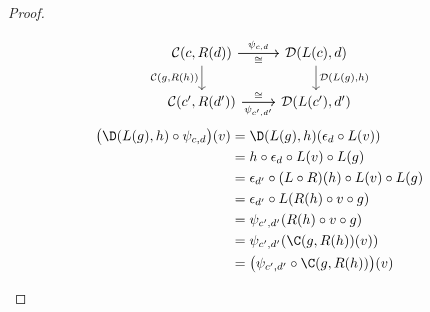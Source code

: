 \begin{theorem}
\begin{proof}
\begin{description}
        \[\begin{tikzcd}[ampersand replacement=\&]
          {\mathcal{C}(c, R(d))} \& {\mathcal{D}(L(c), d)} \\
          {\mathcal{C}(c', R(d'))} \& {\mathcal{D}(L(c'), d')}
          \arrow["{\psi_{c,d}}", from=1-1, to=1-2]
          \arrow["{\mathcal{D}(L(g),h)}", from=1-2, to=2-2]
          \arrow["{\psi_{c',d'}}"', from=2-1, to=2-2]
          \arrow["{\mathcal{C}(g,R(h))}"', from=1-1, to=2-1]
          \arrow["\cong"', from=1-1, to=1-2]
          \arrow["\cong", from=2-1, to=2-2]
        \end{tikzcd}\]
        \[
          \begin{aligned}
            \big(\D(L(g), h)\circ \psi_{c, d}\big)(v)
            &= \D(L(g), h) (\epsilon_d \circ L(v))\\
            &= h \circ \epsilon_d \circ L(v) \circ L(g)\\
            &= \epsilon_{d'}\circ (L\circ R)(h) \circ L(v) \circ L(g)\\
            &= \epsilon_{d'}\circ L(R(h) \circ v \circ g)\\
            &= \psi_{c', d'} (R(h) \circ v \circ g)\\
            &= \psi_{c', d'} (\C(g, R(h))(v))\\
            &= \big(\psi_{c', d'} \circ \C(g, R(h))\big)(v)
          \end{aligned}
        \]
    \end{description}
  \end{proof}
\end{theorem}